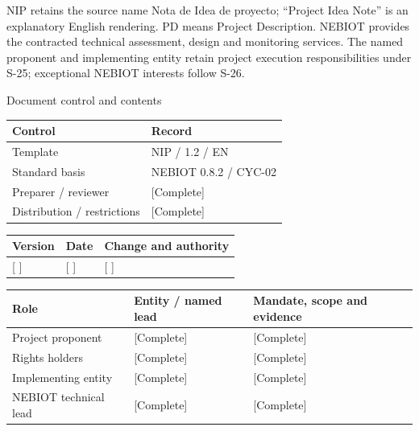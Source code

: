 \vspace{2mm}
NIP retains the source name Nota de Idea de proyecto; “Project Idea Note” is an explanatory English rendering. PD means Project Description.
\vspace{2mm}
NEBIOT provides the contracted technical assessment, design and monitoring services. The named proponent and implementing entity retain project execution responsibilities under S-25; exceptional NEBIOT interests follow S-26.
\clearpage
{\fontsize{23}{27}\selectfont\color{NEBGreen}Document control and contents\par}
\vspace{3mm}
{\sffamily\fontsize{8.3}{10.3}\selectfont\begin{longtable}{@{}P{50.55mm} P{117.94mm}@{}}
\toprule
\textbf{Control} & \textbf{Record}\\\midrule\endhead
\rule{0pt}{7.7mm}Template & NIP / 1.2 / EN\\\hline
\rule{0pt}{7.7mm}Standard basis & NEBIOT 0.8.2 / CYC-02\\\hline
\rule{0pt}{7.7mm}Preparer / reviewer & [Complete]\\\hline
\rule{0pt}{7.7mm}Distribution / restrictions & [Complete]\\\hline
\end{longtable}}
{\sffamily\fontsize{8.3}{10.3}\selectfont\begin{longtable}{@{}P{31.34mm} P{37.94mm} P{95.68mm}@{}}
\toprule
\textbf{Version} & \textbf{Date} & \textbf{Change and authority}\\\midrule\endhead
\rule{0pt}{7.7mm}[ ] & [ ] & [ ]\\\hline
\end{longtable}}
{\sffamily\fontsize{9.5}{11.4}\selectfont\tableofcontents}
{\sffamily\fontsize{8.3}{10.3}\selectfont\begin{longtable}{@{}P{41.24mm} P{46.19mm} P{77.54mm}@{}}
\toprule
\textbf{Role} & \textbf{Entity / named lead} & \textbf{Mandate, scope and evidence}\\\midrule\endhead
\rule{0pt}{7.7mm}Project proponent & [Complete] & [Complete]\\\hline
\rule{0pt}{7.7mm}Rights holders & [Complete] & [Complete]\\\hline
\rule{0pt}{7.7mm}Implementing entity & [Complete] & [Complete]\\\hline
\rule{0pt}{7.7mm}NEBIOT technical lead & [Complete] & [Complete]\\\hline
\end{longtable}}
